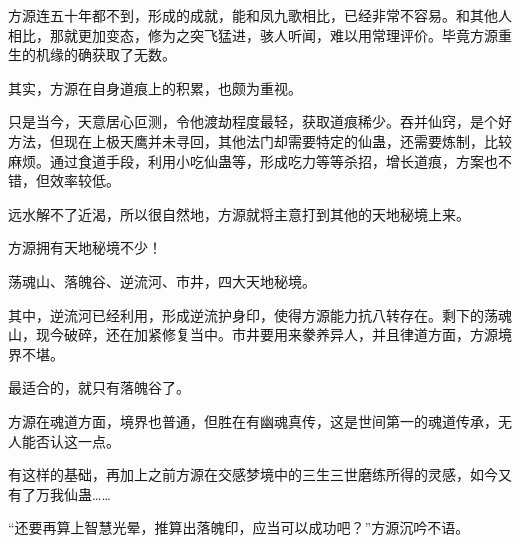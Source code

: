 \begin{this_body}
方源连五十年都不到，形成的成就，能和凤九歌相比，已经非常不容易。和其他人相比，那就更加变态，修为之突飞猛进，骇人听闻，难以用常理评价。毕竟方源重生的机缘的确获取了无数。

其实，方源在自身道痕上的积累，也颇为重视。

只是当今，天意居心叵测，令他渡劫程度最轻，获取道痕稀少。吞并仙窍，是个好方法，但现在上极天鹰并未寻回，其他法门却需要特定的仙蛊，还需要炼制，比较麻烦。通过食道手段，利用小吃仙蛊等，形成吃力等等杀招，增长道痕，方案也不错，但效率较低。

远水解不了近渴，所以很自然地，方源就将主意打到其他的天地秘境上来。

方源拥有天地秘境不少！

荡魂山、落魄谷、逆流河、市井，四大天地秘境。

其中，逆流河已经利用，形成逆流护身印，使得方源能力抗八转存在。剩下的荡魂山，现今破碎，还在加紧修复当中。市井要用来豢养异人，并且律道方面，方源境界不堪。

最适合的，就只有落魄谷了。

方源在魂道方面，境界也普通，但胜在有幽魂真传，这是世间第一的魂道传承，无人能否认这一点。

有这样的基础，再加上之前方源在交感梦境中的三生三世磨练所得的灵感，如今又有了万我仙蛊……

“还要再算上智慧光晕，推算出落魄印，应当可以成功吧？”方源沉吟不语。

\end{this_body}

